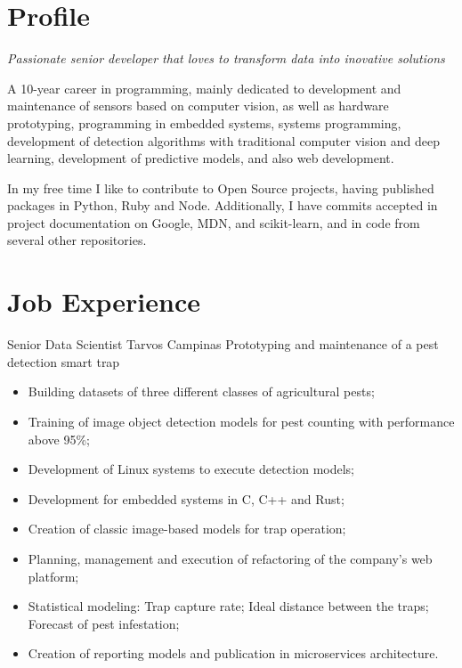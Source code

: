 \documentclass[11pt,a4paper,sans]{moderncv}        %
\begin{document}
\makecvtitle

\section{Profile}

\setlength{\parskip}{0.5em}
\textit {Passionate senior developer that loves to transform data into inovative solutions} \par
\setlength{\parindent}{2em}
A 10-year career in programming, mainly dedicated to development and maintenance of sensors
based on computer vision, as well as hardware prototyping, programming in embedded systems, 
systems programming, development of detection algorithms with traditional computer vision and 
deep learning, development of predictive models, and also web development.

In my free time I like to contribute to Open Source projects, having published packages in 
Python, Ruby and Node. Additionally, I have commits accepted in project documentation on Google, 
MDN, and scikit-learn, and in code from several other repositories.
\setlength{\parindent}{0em}

\section{Job Experience}
{Senior Data Scientist}
{Tarvos}
{Campinas}{}
{Prototyping and maintenance of a pest detection smart trap}
\begin{itemize}%
  \item Building datasets of three different classes of agricultural pests;
  \item Training of image object detection models for pest counting with performance above 95\%;
  \item Development of Linux systems to execute detection models;
  \item Development for embedded systems in C, C++ and Rust;
  \item Creation of classic image-based models for trap operation;
  \item Planning, management and execution of refactoring of the company's web platform;
  \item Statistical modeling: Trap capture rate; Ideal distance between the traps; Forecast of pest infestation;
  \item Creation of reporting models and publication in microservices architecture.
\end{itemize}
\end{document}
